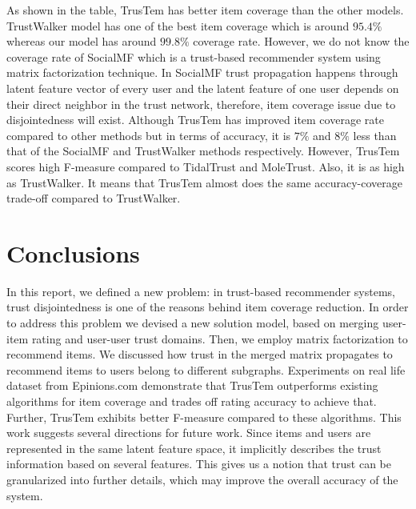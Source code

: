 \documentclass[11pt, conference, onecolumn]{IEEEtran}
\begin{document}
As shown in the table, TrusTem has better item coverage than the other models. TrustWalker model has one of the best item coverage which is around $95.4\%$ whereas our model has around $99.8\%$ coverage rate. However, we do not know the coverage rate of SocialMF which is a trust-based recommender system using matrix factorization technique. In SocialMF trust propagation happens through latent feature vector of every user and the latent feature of one user depends on their direct neighbor in the trust network, therefore, item coverage issue due to disjointedness will exist. Although TrusTem has improved item coverage rate compared to other methods but in terms of accuracy, it is $7\%$ and $8\%$ less than that of the SocialMF and TrustWalker methods respectively. However, TrusTem scores high F-measure compared to TidalTrust and MoleTrust. Also, it is as high as TrustWalker. It means that TrusTem almost does the same accuracy-coverage trade-off compared to TrustWalker.


\section{Conclusions}
In this report, we defined a new problem: in trust-based recommender systems, trust disjointedness is one of the reasons behind item coverage reduction. In order to address this problem we devised a new solution model, based on merging user-item rating and user-user trust domains. Then, we employ matrix factorization to recommend items. We discussed how trust in the merged matrix propagates to recommend items to users belong to different subgraphs. 
Experiments on real life dataset from Epinions.com demonstrate that TrusTem outperforms existing algorithms for item coverage and trades off rating accuracy to achieve that. Further, TrusTem exhibits better F-measure compared to these algorithms. This work suggests several directions for future work. Since items and users are represented in the same latent feature space, it implicitly describes the trust information based on several features. This gives us a notion that trust can be granularized into further details, which may improve the overall accuracy of the system. 


   
    
\end{document}
